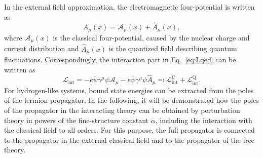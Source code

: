 In the external field approximation, the electromagnetic four-potential is written as
\begin{equation}
A_\mu(x) = \mathcal{A}_\mu(x) + \hat{A}_\mu(x),
\end{equation}
where $\mathcal{A}_\mu(x)$ is the classical four-potential, caused by the nuclear charge and current distribution and $\hat{A}_\mu(x)$ is the quantized field describing quantum fluctuations. Correspondingly, the interaction part in Eq.~\eqref{eq:Lqed} can be written as
\begin{equation}
\label{eq:Lint}
\mathcal{L}_{\text{int}}=-e\bar{\psi}\gamma^\mu \psi \mathcal{A}_\mu-e\bar{\psi}\gamma^\mu \psi \hat{A}_\mu\eqqcolon\mathcal{L}_{\text{int}}^{\text{C}} + \mathcal{L}_{\text{int}}^{\text{Q}}.
\end{equation}
For hydrogen-like systems, bound state energies can be extracted from the poles of the fermion propagator. In the following, it will be demonstrated how the poles of the propagator in the interacting theory can be obtained by perturbation theory in powers of the fine-structure constant $\alpha$, including the interaction with the classical field to all orders. For this purpose, the full propagator is connected to the propagator in the external classical field and to the propagator of the free theory.
